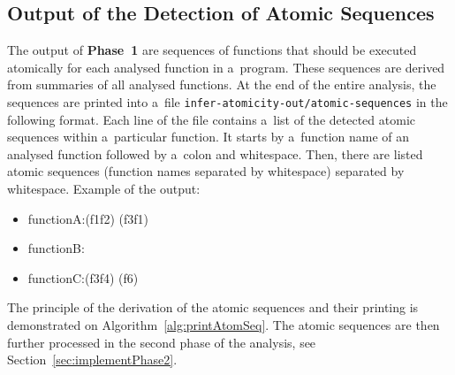 \subsection{Output of the Detection of Atomic Sequences}
\label{sec:implementPhase1Out}

The output of \textbf{Phase~1} are sequences of functions that should
be executed atomically for each analysed function in a~program.
These sequences are derived from summaries of all analysed functions.
At the end of the entire analysis, the sequences are printed into a~file
\texttt{infer-atomicity-out/atomic-sequences} in the following format. Each
line of the file contains a~list of the detected atomic sequences within
a~particular function. It starts by a~function name of an analysed function
followed by a~colon and whitespace. Then, there are listed atomic sequences
(function names separated by whitespace) separated by whitespace.
Example of the output:
\begin{samepage}
    \begin{itemize}[label=]
        \tt

        \item
            functionA:{\textvisiblespace}(f1{\textvisiblespace}f2)%
            {\textvisiblespace}(f3{\textvisiblespace}f1)

        \item
            functionB:{\textvisiblespace}

        \item
            functionC:{\textvisiblespace}(f3{\textvisiblespace}f4)%
            {\textvisiblespace}(f6)
    \end{itemize}
\end{samepage}
The principle of the derivation of the atomic sequences and their printing
is demonstrated on Algorithm~\ref{alg:printAtomSeq}. The atomic sequences
are then further processed in the second phase of the analysis, see
Section~\ref{sec:implementPhase2}.

\begin{algorithm}[hbt]



    \caption{%
        Printing atomic sequences from summaries of all analysed functions
    }
    \label{alg:printAtomSeq}
\end{algorithm}


